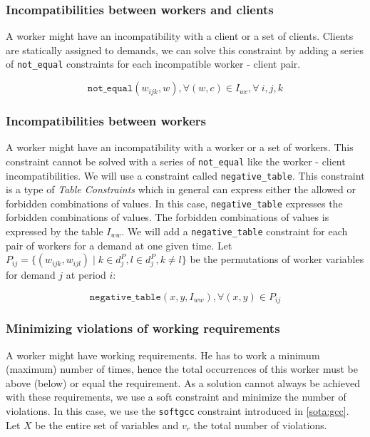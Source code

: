\documentclass[../../thesis.tex]{subfiles}
\begin{document}
\subsubsection{Incompatibilities between workers and clients}

A worker might have an incompatibility with a client or a set of clients. 
Clients are statically assigned to demands, we can solve this constraint by adding 
a series of \texttt{not\_equal} constraints for each incompatible worker - client pair.

\begin{equation}
  \texttt{not\_equal}(w_{ijk}, w), \forall (w, c) \in I_{wc}, \forall \ i, j, k
\end{equation}

\subsubsection{Incompatibilities between workers}

A worker might have an incompatibility with a worker or a set of workers. This constraint cannot be solved 
with a series of \texttt{not\_equal} like the worker - client incompatibilities. We will use a constraint 
called \texttt{negative\_table}. This constraint is a type of \emph{Table Constraints} \cite{Henteryck:Table} which in general can
express either the allowed or forbidden combinations of values. In this case, \texttt{negative\_table} expresses the forbidden combinations of values.
The forbidden combinations of values is expressed by the table $I_{ww}$. 
We will add a \texttt{negative\_table} constraint for each pair of workers for a demand at one given time. Let $P_{ij} = \{ (w_{ijk}, w_{ijl}) \mid k \in d_j^P, l \in d_j^P, k \neq l \}$ 
be the permutations of worker variables for demand $j$ at period $i$:

\begin{equation}
  \texttt{negative\_table}(x, y, I_{ww}),  \forall (x, y) \in P_{ij}
\end{equation}

\subsubsection{Minimizing violations of working requirements}

A worker might have working requirements. He has to work a minimum (maximum) number of times, hence the total 
occurrences of this worker must be above (below) or equal the requirement. As a solution cannot always be 
achieved with these requirements, we use a soft constraint and minimize the number of violations. In this case,
we use the \texttt{softgcc} constraint introduced in \autoref{sota:gcc}. Let $X$ be the entire set of variables and 
$v_r$ the total number of violations.
\end{document}
